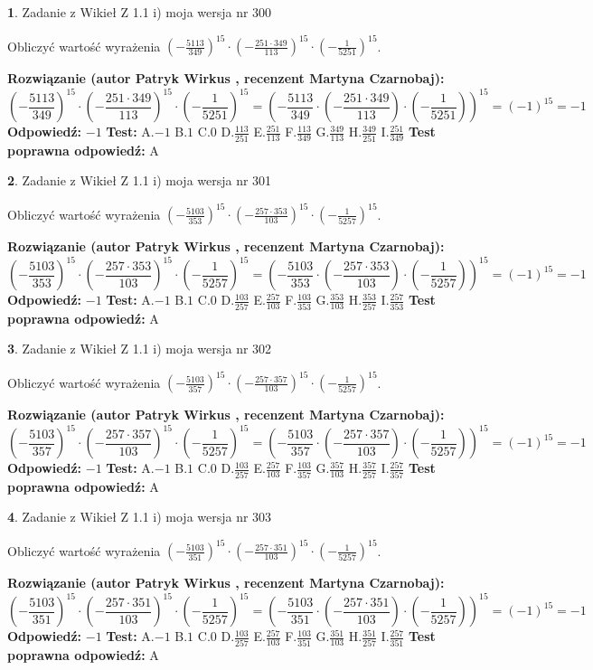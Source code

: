 \documentclass[12pt, a4paper]{article}
\theoremstyle{definition} %
\newtheorem{zad}{}
\newcommand{\zadStart}[1]{\begin{zad}#1\newline}
\newcommand{\zadStop}{\end{zad}}
\newcommand{\rozwStart}[2]{\noindent \textbf{Rozwiązanie (autor #1 , recenzent #2): }\newline}
\newcommand{\rozwStop}{\newline}
\newcommand{\odpStart}{\noindent \textbf{Odpowiedź:}\newline}
\newcommand{\odpStop}{\newline}
\newcommand{\testStart}{\noindent \textbf{Test:}\newline}
\newcommand{\testStop}{\newline}
\newcommand{\kluczStart}{\noindent \textbf{Test poprawna odpowiedź:}\newline}
\newcommand{\kluczStop}{\newline}
\begin{document}
\zadStart{Zadanie z Wikieł Z 1.1 i) moja wersja nr 300}

Obliczyć wartość wyrażenia $(-\frac{5113}{349})^{15} \cdot (-\frac{251 \cdot 349}{113})^{15} \cdot (-\frac{1}{5251})^{15}$.
\zadStop
\rozwStart{Patryk Wirkus}{Martyna Czarnobaj}
$$(-\frac{5113}{349})^{15} \cdot (-\frac{251 \cdot 349}{113})^{15} \cdot (-\frac{1}{5251})^{15} = (-\frac{5113}{349} \cdot (-\frac{251 \cdot 349}{113}) \cdot (-\frac{1}{5251}))^{15} = (-1)^{15} = -1$$
\rozwStop
\odpStart
$-1$
\odpStop
\testStart
A.$-1$ B.$1$ C.$0$ D.$\frac{113}{251}$ E.$\frac{251}{113}$
F.$\frac{113}{349}$ G.$\frac{349}{113}$
H.$\frac{349}{251}$
I.$\frac{251}{349}$
\testStop
\kluczStart
A
\kluczStop



\zadStart{Zadanie z Wikieł Z 1.1 i) moja wersja nr 301}

Obliczyć wartość wyrażenia $(-\frac{5103}{353})^{15} \cdot (-\frac{257 \cdot 353}{103})^{15} \cdot (-\frac{1}{5257})^{15}$.
\zadStop
\rozwStart{Patryk Wirkus}{Martyna Czarnobaj}
$$(-\frac{5103}{353})^{15} \cdot (-\frac{257 \cdot 353}{103})^{15} \cdot (-\frac{1}{5257})^{15} = (-\frac{5103}{353} \cdot (-\frac{257 \cdot 353}{103}) \cdot (-\frac{1}{5257}))^{15} = (-1)^{15} = -1$$
\rozwStop
\odpStart
$-1$
\odpStop
\testStart
A.$-1$ B.$1$ C.$0$ D.$\frac{103}{257}$ E.$\frac{257}{103}$
F.$\frac{103}{353}$ G.$\frac{353}{103}$
H.$\frac{353}{257}$
I.$\frac{257}{353}$
\testStop
\kluczStart
A
\kluczStop



\zadStart{Zadanie z Wikieł Z 1.1 i) moja wersja nr 302}

Obliczyć wartość wyrażenia $(-\frac{5103}{357})^{15} \cdot (-\frac{257 \cdot 357}{103})^{15} \cdot (-\frac{1}{5257})^{15}$.
\zadStop
\rozwStart{Patryk Wirkus}{Martyna Czarnobaj}
$$(-\frac{5103}{357})^{15} \cdot (-\frac{257 \cdot 357}{103})^{15} \cdot (-\frac{1}{5257})^{15} = (-\frac{5103}{357} \cdot (-\frac{257 \cdot 357}{103}) \cdot (-\frac{1}{5257}))^{15} = (-1)^{15} = -1$$
\rozwStop
\odpStart
$-1$
\odpStop
\testStart
A.$-1$ B.$1$ C.$0$ D.$\frac{103}{257}$ E.$\frac{257}{103}$
F.$\frac{103}{357}$ G.$\frac{357}{103}$
H.$\frac{357}{257}$
I.$\frac{257}{357}$
\testStop
\kluczStart
A
\kluczStop



\zadStart{Zadanie z Wikieł Z 1.1 i) moja wersja nr 303}

Obliczyć wartość wyrażenia $(-\frac{5103}{351})^{15} \cdot (-\frac{257 \cdot 351}{103})^{15} \cdot (-\frac{1}{5257})^{15}$.
\zadStop
\rozwStart{Patryk Wirkus}{Martyna Czarnobaj}
$$(-\frac{5103}{351})^{15} \cdot (-\frac{257 \cdot 351}{103})^{15} \cdot (-\frac{1}{5257})^{15} = (-\frac{5103}{351} \cdot (-\frac{257 \cdot 351}{103}) \cdot (-\frac{1}{5257}))^{15} = (-1)^{15} = -1$$
\rozwStop
\odpStart
$-1$
\odpStop
\testStart
A.$-1$ B.$1$ C.$0$ D.$\frac{103}{257}$ E.$\frac{257}{103}$
F.$\frac{103}{351}$ G.$\frac{351}{103}$
H.$\frac{351}{257}$
I.$\frac{257}{351}$
\testStop
\kluczStart
A
\kluczStop
\end{document}
